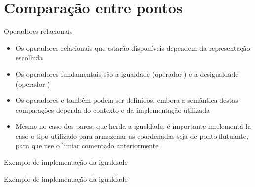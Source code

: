 \section{Comparação entre pontos}

\begin{frame}[fragile]{Operadores relacionais}

    \begin{itemize}
        \item Os operadores relacionais que estarão disponíveis dependem da representação
            escolhida

        \item Os operadores fundamentais são a igualdade (operador ) e a 
            desigualdade (operador )

        \item Os operadores  e  também podem ser definidos, embora a 
            semântica destas comparações dependa do contexto e da implementação utilizada

        \item Mesmo no caso dos pares, que herda a igualdade, é importante implementá-la caso
            o tipo utilizado para armazenar as coordenadas seja de ponto flutuante, para que
            use o limiar comentado anteriormente
   \end{itemize}

\end{frame}

\begin{frame}[fragile]{Exemplo de implementação da igualdade}
\end{frame}

\begin{frame}[fragile]{Exemplo de implementação da igualdade}
\end{frame}
